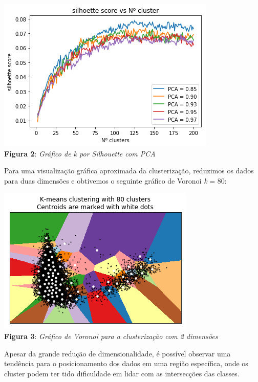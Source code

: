 \documentclass[conference]{IEEEtran}
\begin{document}
\begin{center}
\includegraphics[scale=0.5]{KmeansSilhuetaComPCAs.png}
\\
\textbf{Figura 2}: \textit{Gráfico de k por Silhouette com PCA}
\end{center}
 
Para uma visualização gráfica aproximada da clusterização, reduzimos os dados para duas dimensões e obtivemos o seguinte gráfico de Voronoi \textit{k} = 80:
 
\begin{center}
\includegraphics[scale=0.5]{80Clusters2D.png}
\\
\textbf{Figura 3}: \textit{Gráfico de Voronoi para a clusterização com 2 dimensões}
\end{center} 
 
Apesar da grande redução de dimensionalidade, é possível observar uma tendência para o posicionamento dos dados em uma região específica, onde os cluster podem ter tido dificuldade em lidar com as intersecções das classes. 
\end{document}
